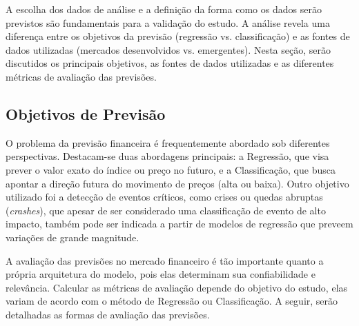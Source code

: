 A escolha dos dados de análise e a definição da forma como os dados serão previstos são fundamentais para a validação do estudo. A análise revela uma diferença entre os objetivos da previsão (regressão vs. classificação) e as fontes de dados utilizadas (mercados desenvolvidos vs. emergentes). Nesta seção, serão discutidos os principais objetivos, as fontes de dados utilizadas e as diferentes métricas de avaliação das previsões.

\subsection{Objetivos de Previsão}

O problema da previsão financeira é frequentemente abordado sob diferentes perspectivas. Destacam-se duas abordagens principais: a Regressão, que visa prever o valor exato do índice ou preço no futuro, e a Classificação, que busca apontar a direção futura do movimento de preços (alta ou baixa). Outro objetivo utilizado foi a detecção de eventos críticos, como crises ou quedas abruptas ({\textit{crashes}}), que apesar de ser considerado uma classificação de evento de alto impacto, também pode ser indicada a partir de modelos de regressão que preveem variações de grande magnitude.

A avaliação das previsões no mercado financeiro é tão importante quanto a própria arquitetura do modelo, pois elas determinam sua confiabilidade e relevância. Calcular as métricas de avaliação depende do objetivo do estudo, elas variam de acordo com o método de Regressão ou Classificação. A seguir, serão detalhadas as formas de avaliação das previsões.

